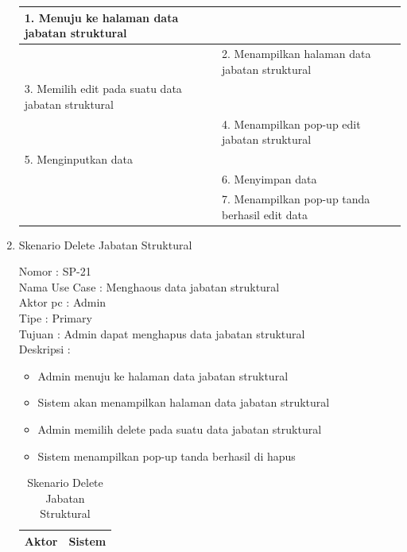 \begin{enumerate}
\begin{table}
\begin{tabular}{ |p{55mm} | p{70mm} |}
		1.	Menuju ke halaman data jabatan struktural &  \\
		
		\hline
		
		&  2.	Menampilkan halaman data jabatan struktural \\
		
		\hline
		
		3. Memilih edit pada suatu data jabatan struktural & \\
		
		\hline
		
		& 4.	Menampilkan pop-up edit jabatan struktural\\
		
		\hline
		
		5.	Menginputkan data  & \\
		\hline
		
		& 6.	Menyimpan data \\
		\hline
		
		& 7.	Menampilkan pop-up tanda berhasil edit data \\
		\hline
		
	\end{tabular}
\end{table}

\item Skenario Delete Jabatan Struktural

Nomor \kern 3.6pc : SP-21 \\
Nama Use Case : Menghaous data jabatan struktural \\
Aktor  pc : Admin \\
Tipe \kern 4.6pc : Primary \\
Tujuan \kern 3.6pc : Admin dapat menghapus data jabatan struktural\\
Deskripsi \kern 2.5pc : 

\begin{itemize}
	\item Admin menuju ke halaman data jabatan struktural
	\item Sistem akan menampilkan halaman data jabatan struktural
	\item Admin memilih delete pada suatu data jabatan struktural
	\item Sistem menampilkan pop-up tanda berhasil di hapus 
	
\end{itemize}

\begin{table}
	\caption{Skenario Delete Jabatan Struktural}
	\centering
	\begin{tabular}{ | p{55mm} | p{70mm}|}
		\hline 
		\textbf{Aktor} & \textbf{Sistem} \\
		\hline
		

\end{tabular}
\end{table}
\end{enumerate}
